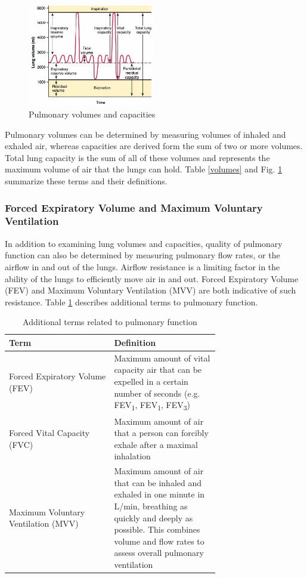 \documentclass{article}
\begin{document}
\begin{figure}[h]
\centering\includegraphics[width=0.5\textwidth]{../images/PF_I_3.jpg}
\caption{Pulmonary volumes and capacities}
\label{capacities}
\end{figure}

Pulmonary volumes can be determined by measuring volumes of inhaled and exhaled air, whereas capacities are derived form the sum of two or more volumes. Total lung capacity is the sum of all of these volumes and represents the maximum volume of air that the lungs can hold. Table \ref{volumes} and Fig. \ref{capacities} summarize these terms and their definitions.\\

\subsubsection*{Forced Expiratory Volume and Maximum Voluntary Ventilation}
In addition to examining lung volumes and capacities, quality of pulmonary function can also be determined by measuring pulmonary flow rates, or the airflow in and out of the lungs. Airflow resistance is a limiting factor in the ability of the lungs to efficiently move air in and out. Forced Expiratory Volume (FEV) and Maximum Voluntary Ventilation (MVV) are both indicative of such resistance. Table \ref{fvv} describes additional terms to pulmonary function.

	\begin{table}[h]
	\centering
	\caption{Additional terms related to pulmonary function}
	\begin{tabular}[h!]{p{0.35\linewidth}p{0.35\linewidth}}
	\toprule
	Term & Definition\\
	\midrule
	Forced Expiratory Volume (FEV) & Maximum amount of vital capacity air that can be expelled in a certain number of seconds (e.g. FEV\textsubscript{1}, FEV\textsubscript{1}, FEV\textsubscript{3})\\\midrule
	Forced Vital Capacity (FVC) & Maximum amount of air that a person can forcibly exhale after a maximal inhalation\\\midrule
	Maximum Voluntary Ventilation (MVV) & Maximum amount of air that can be inhaled and exhaled in one minute in L/min, breathing as quickly and deeply as possible. This combines volume and flow rates to assess overall pulmonary ventilation\\
	\bottomrule
	\end{tabular}
	\label{fvv}
	\end{table}
\end{document}
